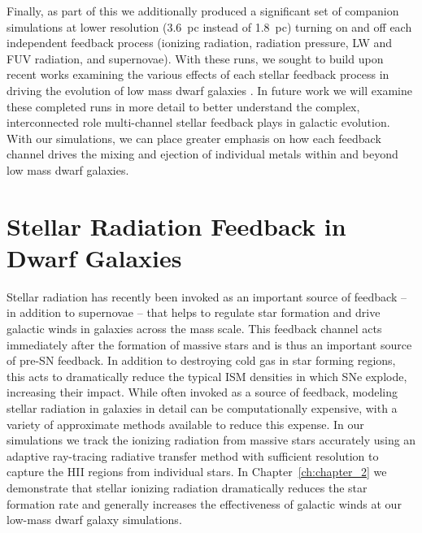 Finally, as part of this \dissertation we additionally produced a significant set of companion simulations at lower resolution (3.6~pc instead of 1.8~pc) turning on and off each independent feedback process (ionizing radiation, radiation pressure, LW and FUV radiation, and supernovae). With these runs, we sought to build upon recent works examining the various effects of each stellar feedback process in driving the evolution of low mass dwarf galaxies \citep{Hu2016,Hu2017,Hu2018,Forbes2016}. In future work we will examine these completed runs in more detail to better understand the complex, interconnected role multi-channel stellar feedback plays in galactic evolution. With our simulations, we can place greater emphasis on how each feedback channel drives the mixing and ejection of individual metals within and beyond low mass dwarf galaxies.

\section{Stellar Radiation Feedback in Dwarf Galaxies}

Stellar radiation has recently been invoked as an important source of feedback -- in addition to supernovae -- that helps to regulate star formation and drive galactic winds in galaxies across the mass scale. This feedback channel acts immediately after the formation of massive stars and is thus an important source of pre-SN feedback. In addition to destroying cold gas in star forming regions, this acts to dramatically reduce the typical ISM densities in which SNe explode, increasing their impact. While often invoked as a source of feedback, modeling stellar radiation in galaxies in detail can be computationally expensive, with a variety of approximate methods available to reduce this expense. In our simulations we track the ionizing radiation from massive stars accurately using an adaptive ray-tracing radiative transfer method with sufficient resolution to capture the HII regions from individual stars. In Chapter~\ref{ch:chapter_2} we demonstrate that stellar ionizing radiation dramatically reduces the star formation rate and generally increases the effectiveness of galactic winds at our low-mass dwarf galaxy simulations.

